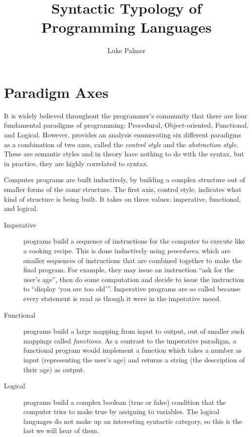\documentclass[12pt]{article}
\title{Syntactic Typology of Programming Languages}
\author{Luke Palmer}
\begin{document}
\maketitle

\section{Paradigm Axes}

It is widely believed throughout the programmer's community that there
are four fundamental paradigms of programming: Procedural,
Object-oriented, Functional, and Logical.   However, \cite{Palmer-2005}
provides an analysis enumerating six different paradigms as a
combination of two axes, called the \textit{control style} and the
\textit{abstraction style}.  These are semantic styles and in theory
have nothing to do with the syntax, but in practice, they are highly
correlated to syntax.

Computer programs are built inductively, by building a complex structure
out of smaller forms of the same structure.  The first axis, control
style, indicates what kind of structure is being built.  It takes on
three values: imperative, functional, and logical.  

\begin{description}
\item[Imperative] programs build a sequence of instructions for the
computer to execute like a cooking recipe.  This is done inductively
using \textit{procedures}, which are smaller sequences of instructions
that are combined together to make the final program.  For example, they
may issue an instruction ``ask for the user's age'', then do some
computation and decide to issue the instruction to ``display `you are
too old'{}''.  Imperative programs are so called because every statement
is read as though it were in the imperative mood.
\item[Functional] programs build a large mapping from input to output,
out of smaller such mappings called \textit{functions}.  As a contrast
to the imperative paradigm, a functional program would implement a
function which takes a number as input (representing the user's age) and
returns a string (the description of their age) as output. 
\item[Logical] programs build a complex boolean (true or false)
condition that the computer tries to make true by assigning to
variables.  The logical languages do not make up an interesting
syntactic category, so this is the last we will hear of them.
\end{description}
\end{document}
